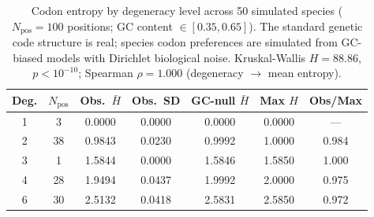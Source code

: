\begin{table}[h]
\centering
\caption{Codon entropy by degeneracy level across 50 simulated species ($N_{\text{pos}}=100$ positions; GC content $\in [0.35, 0.65]$). The standard genetic code structure is real; species codon preferences are simulated from GC-biased models with Dirichlet biological noise. Kruskal-Wallis $H=88.86$, $p< 10^{-10}$; Spearman $\rho=1.000$ (degeneracy $\to$ mean entropy).}
\label{tab:codon_entropy}
\begin{tabular}{ccccccc}
\toprule
Deg. & $N_{\text{pos}}$ & Obs.\ $\bar{H}$ & Obs.\ SD & GC-null $\bar{H}$ & Max $H$ & Obs/Max \\
\midrule
  1 & 3 & 0.0000 & 0.0000 & 0.0000 & 0.0000 & --- \\
  2 & 38 & 0.9843 & 0.0230 & 0.9992 & 1.0000 & 0.984 \\
  3 & 1 & 1.5844 & 0.0000 & 1.5846 & 1.5850 & 1.000 \\
  4 & 28 & 1.9494 & 0.0437 & 1.9992 & 2.0000 & 0.975 \\
  6 & 30 & 2.5132 & 0.0418 & 2.5831 & 2.5850 & 0.972 \\
\bottomrule
\end{tabular}
\end{table}
